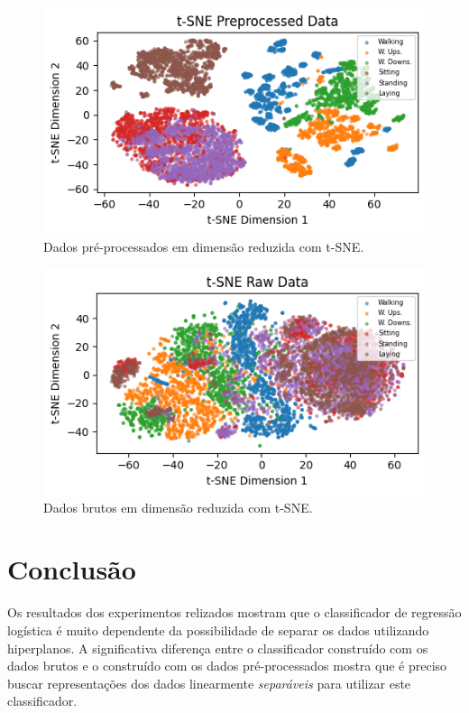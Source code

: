 \documentclass[final,5p]{elsarticle}
\numberwithin{equation}{section}
\begin{document}
        \begin{figure}[hbt!]
            \includegraphics[width=0.95\columnwidth]{C_t-SNE.png}
            \caption{Dados pré-processados em dimensão reduzida com t-SNE.}
            \label{fig:t_sne_preprocessados}
        \end{figure}

        \begin{figure}[hbt!]
            \includegraphics[width=0.95\columnwidth]{C_t-SNE_raw.png}
            \caption{Dados brutos em dimensão reduzida com t-SNE.}
            \label{fig:t_sne_brutos}
        \end{figure}

\section{Conclusão}

        Os resultados dos experimentos relizados mostram que o classificador de regressão logística é muito dependente da possibilidade de separar os dados utilizando hiperplanos. A significativa diferença entre o classificador construído com os dados brutos e o construído com os dados pré-processados mostra que é preciso buscar representações dos dados linearmente \emph{separáveis} para utilizar este classificador.
\end{document}
